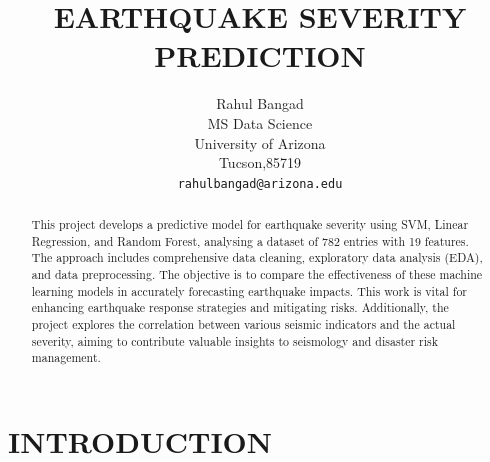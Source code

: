 \documentclass{article}
\title{EARTHQUAKE SEVERITY PREDICTION}
\author{%
  Rahul Bangad\\
  MS Data Science\\
  University of Arizona\\
  Tucson,85719 \\
  \texttt{rahulbangad@arizona.edu} \\
}
\begin{document}
\maketitle

\begin{abstract}
  This project develops a predictive model for earthquake severity using SVM, Linear Regression, and Random Forest, analysing a dataset of 782 entries with 19 features. The approach includes comprehensive data cleaning, exploratory data analysis (EDA), and data preprocessing. The objective is to compare the effectiveness of these machine learning models in accurately forecasting earthquake impacts. This work is vital for enhancing earthquake response strategies and mitigating risks. Additionally, the project explores the correlation between various seismic indicators and the actual severity, aiming to contribute valuable insights to seismology and disaster risk management.
\end{abstract}


\section{INTRODUCTION}
\end{document}
